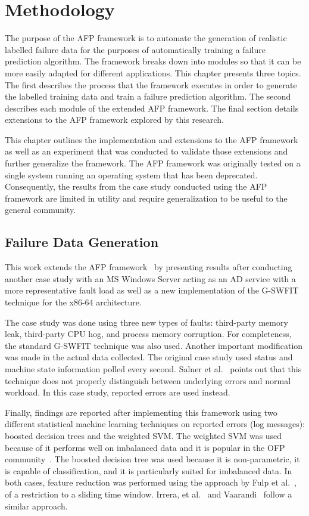 \chapter{Methodology} \label{chapter3}
The purpose of the \ac{AFP} framework is to automate the generation of
realistic labelled failure data for the purposes of automatically training a
failure prediction algorithm.  The framework breaks down into modules so that
it can be more easily adapted for different applications.  This chapter
presents three topics.  The first describes the process that the framework
executes in order to generate the labelled training data and train a failure
prediction algorithm.  The second describes each module of the extended
\ac{AFP} framework.  The final section details extensions to the \ac{AFP}
framework explored by this research.

This chapter outlines the implementation and extensions to the \ac{AFP}
framework~\cite{irrera2015} as well as an experiment that was conducted to
validate those extensions and further generalize the framework.  The \ac{AFP}
framework was originally tested on a single system running an operating system
that has been deprecated.  Consequently, the results from the case study
conducted using the \ac{AFP} framework are limited in utility and require
generalization to be useful to the general community.

\section{Failure Data Generation} \label{sec:generation}
This work extends the \ac{AFP} framework~\cite{irrera2015} by presenting
results after conducting another case study with an \ac{MS} Windows Server
acting as an \ac{AD} service with a more representative fault load as well as a
new implementation of the \ac{G-SWFIT} technique for the x86-64 architecture.

The case study was done using three new types of faults: third-party memory
leak, third-party \ac{CPU} hog, and process memory corruption.  For
completeness, the standard \ac{G-SWFIT} technique was also used.  Another
important modification was made in the actual data collected.  The original
case study used status and machine state information polled every second.
Salner et al.~\cite{salfnerSurvey} points out that this technique does not
properly distinguish between underlying errors and normal workload.  In this
case study, reported errors are used instead.

Finally, findings are reported after implementing this framework using two
different statistical machine learning techniques on reported errors (log
messages): boosted decision trees and the weighted \ac{SVM}.  The weighted
\ac{SVM} was used because of it performs well on imbalanced data and it is
popular in the \ac{OFP} community~\cite{salfnerSurvey}.  The boosted decision
tree was used because it is non-parametric, it is capable of classification,
and it is particularly suited for imbalanced data.  In both cases, feature
reduction was performed using the approach by Fulp et al.~\cite{fulp2008}, of a
restriction to a sliding time window.  Irrera, et al.~\cite{irrera2013a} and
Vaarandi~\cite{vaarandi2002} follow a similar approach.

